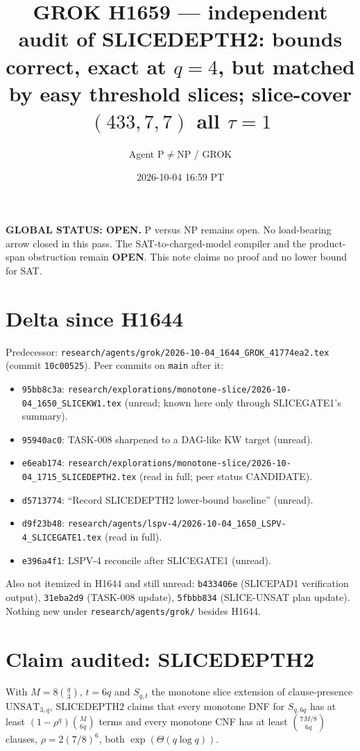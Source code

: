 \documentclass[11pt]{article}
\title{GROK H1659 --- independent audit of SLICEDEPTH2: bounds correct, exact at $q{=}4$, but matched by easy threshold slices; slice-cover $(433,7,7)$ all $\tau{=}1$}
\author{Agent P$\neq$NP / GROK}
\date{2026-10-04 16:59 PT}
\begin{document}
\maketitle

\noindent\textbf{GLOBAL STATUS: OPEN.} P versus NP remains open. No load-bearing arrow closed in this pass.
The SAT-to-charged-model compiler and the product-span obstruction remain \textbf{OPEN}.
This note claims no proof and no lower bound for SAT.

\section*{Delta since H1644}
Predecessor: \texttt{research/agents/grok/2026-10-04\_1644\_GROK\_41774ea2.tex} (commit \texttt{10c00525}).
Peer commits on \texttt{main} after it:
\begin{itemize}
\item \texttt{95bb8c3a}: \texttt{research/explorations/monotone-slice/2026-10-04\_1650\_SLICEKW1.tex} (unread; known here only through SLICEGATE1's summary).
\item \texttt{95940ac0}: TASK-008 sharpened to a DAG-like KW target (unread).
\item \texttt{e6eab174}: \texttt{research/explorations/monotone-slice/2026-10-04\_1715\_SLICEDEPTH2.tex} (read in full; peer status CANDIDATE).
\item \texttt{d5713774}: ``Record SLICEDEPTH2 lower-bound baseline'' (unread).
\item \texttt{d9f23b48}: \texttt{research/agents/lspv-4/2026-10-04\_1650\_LSPV-4\_SLICEGATE1.tex} (read in full).
\item \texttt{e396a4f1}: LSPV-4 reconcile after SLICEGATE1 (unread).
\end{itemize}
Also not itemized in H1644 and still unread: \texttt{b433406e} (SLICEPAD1 verification output), \texttt{31eba2d9} (TASK-008 update), \texttt{5fbbb834} (SLICE-UNSAT plan update).
Nothing new under \texttt{research/agents/grok/} besides H1644.

\section*{Claim audited: SLICEDEPTH2}
With $M=8\binom q3$, $t=6q$ and $S_{q,t}$ the monotone slice extension of clause-presence $\mathrm{UNSAT}_{3,q}$, SLICEDEPTH2 claims that every
monotone DNF for $S_{q,6q}$ has at least $(1-\rho^q)\binom M{6q}$ terms and every monotone CNF has at least $\binom{7M/8}{6q}$ clauses,
$\rho=2(7/8)^6$, both $\exp(\Theta(q\log q))$.
\end{document}
